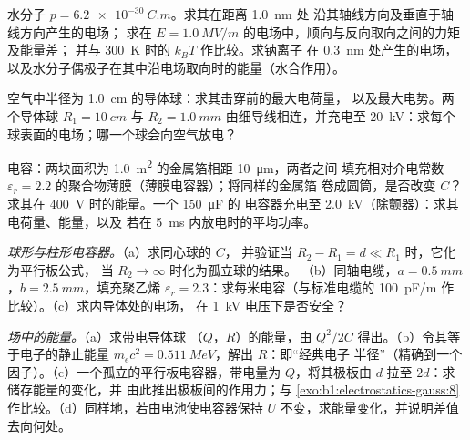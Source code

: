 \begin{exercise}[$\star\star$]\label{exo:b1:potential-capacitors:7}
水分子 $p = \qty{6.2e-30}{C.m}$。求其在距离 \qty{1.0}{nm} 处
沿其轴线方向及垂直于轴线方向产生的电场；
求在 $E = \qty{1.0}{MV/m}$ 的电场中，顺向与反向取向之间的力矩及能量差；
并与 \qty{300}{K} 时的 $k_BT$ 作比较。求钠离子
在 \qty{0.3}{nm} 处产生的电场，以及水分子偶极子在其中沿电场取向时的能量（水合作用）。
\end{exercise}

\begin{exercise}[$\star\star$]\label{exo:b1:potential-capacitors:8}
空气中半径为 \qty{1.0}{cm} 的导体球：求其击穿前的最大电荷量，
以及最大电势。两个导体球 $R_1 = \qty{10}{cm}$
与 $R_2 = \qty{1.0}{mm}$ 由细导线相连，并充电至
\qty{20}{kV}：求每个球表面的电场；哪一个球会向空气放电？
\end{exercise}

\begin{exercise}[$\star\star$]\label{exo:b1:potential-capacitors:9}
电容：两块面积为 \qty{1.0}{m^2} 的金属箔相距 \qty{10}{\micro m}，两者之间
填充相对介电常数 $\varepsilon_r = 2.2$ 的聚合物薄膜（薄膜电容器）；将同样的金属箔
卷成圆筒，是否改变 $C$？求其在 \qty{400}{V} 时的能量。一个 \qty{150}{\micro F} 的
电容器充电至 \qty{2.0}{kV}（除颤器）：求其电荷量、能量，以及
若在 \qty{5}{ms} 内放电时的平均功率。
\end{exercise}

\begin{exercise}[$\star\star\star$]\label{exo:b1:potential-capacitors:10}
\emph{球形与柱形电容器。}（a）求同心球的 $C$，
并验证当 $R_2 - R_1 = d \ll R_1$ 时，它化为平行板公式，
当 $R_2 \to \infty$ 时化为孤立球的结果。
（b）同轴电缆，$a = \qty{0.5}{mm}$，$b = \qty{2.5}{mm}$，填充聚乙烯
$\varepsilon_r = 2.3$：求每米电容（与标准电缆的 \qty{100}{pF/m}
作比较）。（c）求内导体处的电场，
在 \qty{1}{kV} 电压下是否安全？
\end{exercise}

\begin{exercise}[$\star\star\star$]\label{exo:b1:potential-capacitors:11}
\emph{场中的能量。}（a）求带电导体球
（$Q$，$R$）的能量，由 $Q^2/2C$ 得出。（b）令其等于电子的静止能量
$m_ec^2 = \qty{0.511}{MeV}$，解出 $R$：即“经典电子
半径”（精确到一个因子）。（c）一个孤立的平行板电容器，带电量为
$Q$，将其极板由 $d$ 拉至 $2d$：求储存能量的变化，并
由此推出极板间的作用力；与
\cref{exo:b1:electrostatics-gauss:8}作比较。（d）同样地，若由电池使电容器保持
$U$ 不变，求能量变化，并说明差值去向何处。
\end{exercise}


